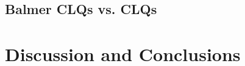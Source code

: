 \documentclass[a4paper,fleqn,usenatbib]{mnras}
\begin{document}
\subsection{Balmer CLQs vs. \civ CLQs}


\section{Discussion and Conclusions}





\bsp	%
\label{lastpage}
\end{document}
